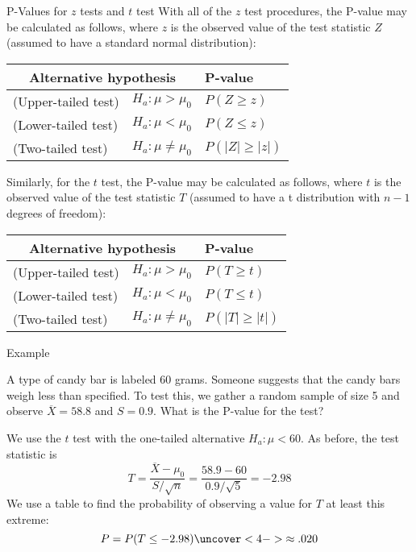 \documentclass[handout]{beamer}
\begin{document}
\begin{frame}{P-Values for $z$ tests and $t$ test}
With all of the $z$ test procedures, the P-value may be calculated as follows, where $z$ is the observed value of the test statistic $Z$ (assumed to have a standard normal distribution):
\begin{center}
\begin{tabular}{ll|l}
\multicolumn{2}{c}{Alternative hypothesis} & P-value \\ \hline
(Upper-tailed test) & $H_a: \mu>\mu_0$ & $P(Z\geq z)$ \\
(Lower-tailed test) & $H_a: \mu<\mu_0$ & $P(Z\leq z)$ \\
(Two-tailed test) & $H_a: \mu\neq\mu_0$ & $P(|Z|\geq |z|)$\\
\end{tabular}
\end{center}

Similarly, for the $t$ test, the P-value may be calculated as follows, where $t$ is the observed value of the test statistic $T$ (assumed to have a t distribution with $n-1$ degrees of freedom):
\begin{center}
\begin{tabular}{ll|l}
\multicolumn{2}{c}{Alternative hypothesis} & P-value \\ \hline
(Upper-tailed test) & $H_a: \mu>\mu_0$ & $P(T\geq t)$ \\
(Lower-tailed test) & $H_a: \mu<\mu_0$ & $P(T\leq t)$ \\
(Two-tailed test) & $H_a: \mu\neq\mu_0$ & $P(|T|\geq |t|)$\\
\end{tabular}
\end{center}

\end{frame}

\begin{frame}{Example}
\begin{block}{}
A type of candy bar is labeled 60 grams. Someone suggests that the candy bars weigh less than specified. To test this, we gather a random sample of size 5 and observe $\overline X=58.8$ and $S=0.9$. What is the P-value for the test?
\end{block}

\pause We use the $t$ test with the one-tailed alternative $H_a: \mu<60$. As before, the test statistic  is
$$T=\frac{\overline X-\mu_0}{S/\sqrt{n}}=\frac{58.9-60}{0.9/\sqrt{5}}=-2.98$$
\pause We use a table to find the probability of observing a value for $T$ at least this extreme:
$$P=P(T\leq -2.98)
\uncover<4->{ \approx .020 }$$
\end{frame}
\end{document}
